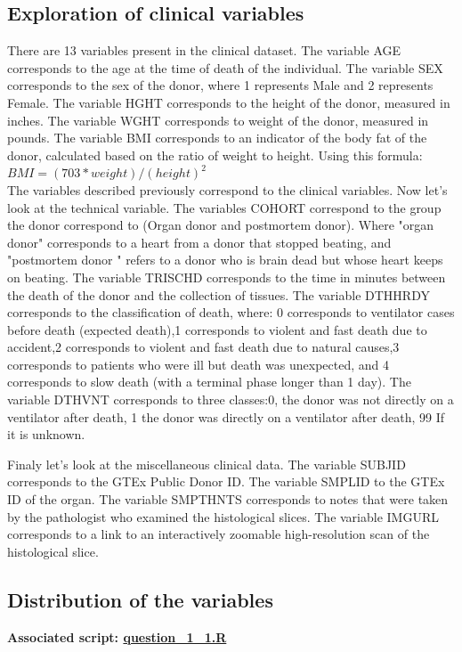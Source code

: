 \documentclass[a4paper, 11pt]{article}
\begin{document}
\begin{multicols}{2}
\section{Exploration of  clinical variables}
There are 13 variables present in the clinical dataset.
The variable AGE corresponds to the age at the time of death of the individual.
The variable SEX corresponds to the sex of the donor, where 1 represents Male and 2 represents Female.
The variable HGHT corresponds to the height of the donor, measured in inches.
The variable WGHT corresponds to weight of the donor, measured in pounds. 
The variable BMI corresponds to an indicator of the body fat of the donor, calculated based on the ratio of weight to height. Using this formula: 
\\
$ BMI = (703*weight)/(height)^2$ 
\\
The variables described previously correspond to the clinical variables. Now let's look at the technical variable. 
The variables COHORT correspond to the group the donor correspond to (Organ donor and postmortem donor). Where "organ donor" corresponds to a heart from a donor that stopped beating, and "postmortem donor " refers to a donor who is brain dead but whose heart keeps on beating.
The variable TRISCHD corresponds to the time in minutes between the death of the donor and the collection of tissues.
The variable DTHHRDY corresponds to the classification of death, where: 0 corresponds to ventilator cases before death (expected death),1 corresponds to violent and fast death due to accident,2 corresponds to violent and fast death due to natural causes,3 corresponds to patients who were ill but death was unexpected, and 4 corresponds to slow death (with a terminal phase longer than 1 day). 
The variable DTHVNT corresponds to three classes:0, the donor was not directly on a ventilator after death, 1 the donor was directly on a ventilator after death, 99 If it is unknown.

Finaly let's look at the miscellaneous clinical data. 
The variable SUBJID corresponds to the GTEx Public Donor ID. 
The variable SMPLID to the GTEx ID of the organ. 
The variable SMPTHNTS corresponds to notes that were taken by the pathologist who examined the histological slices. 
The variable IMGURL corresponds to a link to an interactively zoomable high-resolution scan of the histological slice.

\subsection{Distribution of the variables}
\begin{scriptsize}	
	\textbf{Associated script: \href{https://github.com/leopoldguyot/BINF-F401-Project/blob/main/question_1_1.R}{question\_1\_1.R}}
\end{scriptsize}


\end{multicols}
\end{document}
